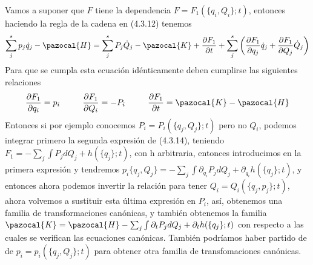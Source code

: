 \newpage
Vamos a suponer que $F$ tiene la dependencia $F = F_1(\{q_i,Q_i\};t)$, entonces haciendo la regla de la cadena en (4.3.12) tenemos
\begin{equation} \label{4.2.7}
    \sum_j^s p_j \dot{q}_j -\pazocal{H} = \sum_j^s P_j \dot{Q}_j -\pazocal{K} + \frac{\partial F_1}{\partial t} + \sum_j^s \left(\frac{\partial F_1}{\partial q_j}\dot{q}_j + \frac{\partial F_1}{\partial Q_j}\dot{Q}_j\right)
\end{equation} 
Para que se cumpla esta ecuación idénticamente deben cumplirse las siguientes relaciones
\begin{equation} \label{4.2.7}
    \frac{\partial F_1}{\partial q_i} = p_i \ \ \ \ \ \ \ \ \frac{\partial F_1}{\partial Q_i} = -P_i \ \ \ \ \ \ \ \ \frac{\partial F_1}{\partial t} = \pazocal{K}-\pazocal{H}
\end{equation} 
Entonces si por ejemplo conocemos $P_i=P_i(\{q_j,Q_j\};t)$ pero no $Q_i$, podemos integrar primero la segunda expresión de (4.3.14), teniendo $F_1 = -\sum_j \int P_j dQ_j + h(\{q_j\};t)$, con h arbitraria, entonces introducimos en la primera expresión y tendremos $p_i \{q_j,Q_j\}= -\sum_j\int \partial_{q_i} P_j dQ_j + \partial_{q_i} h(\{q_j\};t)$, y entonces ahora podemos invertir la relación para tener $Q_i=Q_i(\{q_j,p_j\};t)$, ahora volvemos a sustituir esta última expresión en $P_i$, así, obtenemos una familia de transformaciones canónicas, y también obtenemos la familia $\pazocal{K} = \pazocal{H}-\sum_j\int \partial_t P_j dQ_j + \partial_t h(\{q_j\};t)$ con respecto a las cuales se verifican las ecuaciones canónicas. También podríamos haber partido de de $p_i=p_i(\{q_j,Q_j\};t)$ para obtener otra familia de transfomaciones canónicas.

